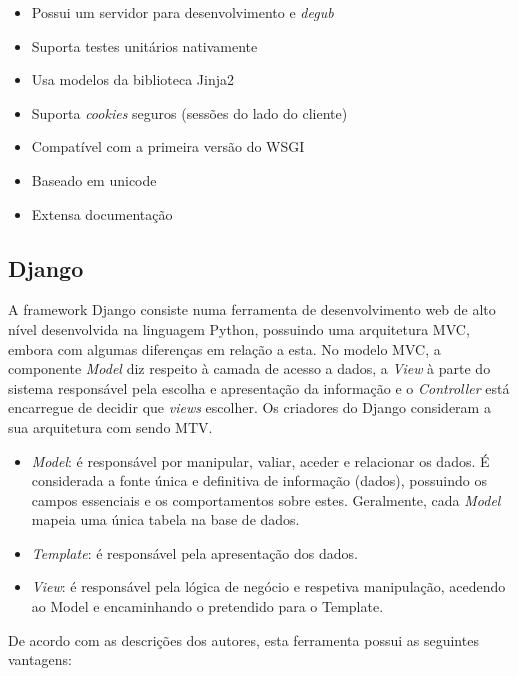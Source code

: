 \begin{itemize}
	\item Possui um servidor para desenvolvimento e \textit{degub}
	\item Suporta testes unitários nativamente 
	\item Usa modelos da biblioteca Jinja2
	\item Suporta \textit{cookies} seguros (sessões do lado do cliente)
	\item Compatível com a primeira versão do \ac{WSGI}
	\item Baseado em unicode
	\item Extensa documentação 
\end{itemize}




\subsection{Django}


A framework Django consiste numa ferramenta de desenvolvimento web de alto nível desenvolvida na linguagem Python, possuindo uma arquitetura \ac{MVC}\cite{Deacon2005}, embora com algumas diferenças em relação a esta. No modelo \ac{MVC}, a componente \textit{Model} diz respeito à camada de acesso a dados, a \textit{View} à parte do sistema responsável pela escolha e apresentação da informação e o \textit{Controller} está encarregue de decidir que \textit{views} escolher. Os criadores do Django consideram a sua arquitetura com sendo \ac{MTV}\cite{Index}. 

\begin{itemize}
	\item \textit{Model}: é responsável por manipular, valiar, aceder e relacionar os dados. É considerada a fonte única e definitiva de informação (dados), possuindo os campos essenciais e os comportamentos sobre estes. Geralmente, cada \textit{Model} mapeia uma única tabela na base de dados. 
	
	
	\item \textit{Template}: é responsável pela apresentação dos dados. 

	\item \textit{View}: é responsável pela lógica de negócio e respetiva manipulação, acedendo ao Model e encaminhando o pretendido para o Template. 
	
\end{itemize}



De acordo com as descrições dos autores, esta ferramenta possui as seguintes vantagens\cite{Index}: 


